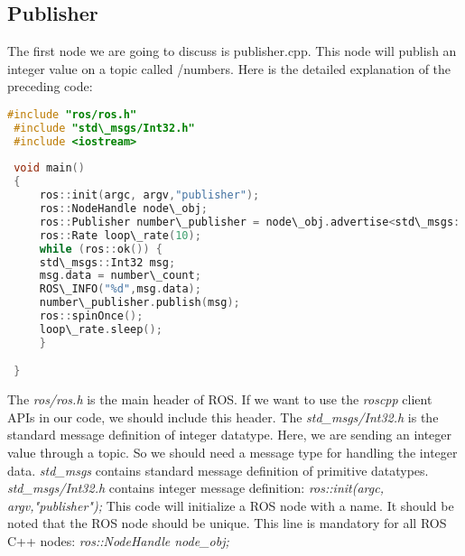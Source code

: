 \subsection{Publisher}
 The first node we are going to discuss is publisher.cpp.
 This node will publish an integer value on a topic called /numbers. Here is the detailed explanation of the preceding code:
 
\begin{lstlisting}[language=CPP]
 #include "ros/ros.h"
 #include "std\_msgs/Int32.h"
 #include <iostream>
 
 void main()
 {
	 ros::init(argc, argv,"publisher");
	 ros::NodeHandle node\_obj;
	 ros::Publisher number\_publisher = node\_obj.advertise<std\_msgs::Int32>("/numbers",10);
	 ros::Rate loop\_rate(10);
	 while (ros::ok()) {
	 std\_msgs::Int32 msg;
	 msg.data = number\_count;
	 ROS\_INFO("%d",msg.data);
	 number\_publisher.publish(msg);
	 ros::spinOnce();
	 loop\_rate.sleep();
	 }

 }
 \end{lstlisting}
 
 The \textit{ros/ros.h} is the main header of ROS. If we want to use the \textit{roscpp} client APIs in our code, we should include this header. 
 The \textit{std\_msgs/Int32.h} is the standard message definition of integer datatype.
 Here, we are sending an integer value through a topic. So we should need a message type for handling the integer data. \textit{std\_msgs} contains standard message definition of primitive datatypes. \textit{std\_msgs/Int32.h} contains integer message definition: \textit{ros::init(argc, argv,"publisher");} This code will initialize a ROS node with a name. It should be noted that the ROS node should be unique. This line is mandatory for all ROS C++ nodes: \textit{ros::NodeHandle node\_obj;}
 
